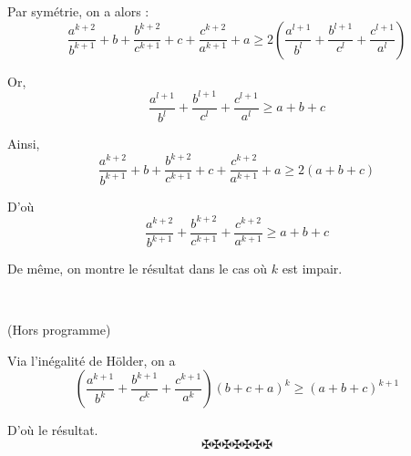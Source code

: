 Par sym{\'e}trie, on a alors :
\[ \frac{a^{k + 2}}{b^{k + 1}} + b + \frac{b^{k + 2}}{c^{k + 1}} + c +
   \frac{c^{k + 2}}{a^{k + 1}} + a \geqslant 2 \left( \frac{a^{l + 1}}{b^l} +
   \frac{b^{l + 1}}{c^l} + \frac{c^{l + 1}}{a^l} \right) \]


Or,
\[ \frac{a^{l + 1}}{b^l} + \frac{b^{l + 1}}{c^l} + \frac{c^{l + 1}}{a^l}
   \geqslant a + b + c \]


Ainsi,
\[ \  \]
\[ \frac{a^{k + 2}}{b^{k + 1}} + b + \frac{b^{k + 2}}{c^{k + 1}} + c +
   \frac{c^{k + 2}}{a^{k + 1}} + a \geqslant 2 (a + b + c) \]


D'o{\`u}
\[ \frac{a^{k + 2}}{b^{k + 1}} + \frac{b^{k + 2}}{c^{k + 1}} + \frac{c^{k +
   2}}{a^{k + 1}} \geqslant a + b + c \]


De m{\^e}me, on montre le r{\'e}sultat dans le cas o{\`u} $k$ est impair.

\

(Hors programme)

Via l'in{\'e}galit{\'e} de H{\"o}lder, on a
\[ \left( \frac{a^{k + 1}}{b^k} + \frac{b^{k + 1}}{c^k} + \frac{c^{k +
   1}}{a^k} \right) (b + c + a)^k \geqslant (a + b + c)^{k + 1} \]


D'o{\`u} le r{\'e}sultat.
\[ \maltese \maltese \maltese \maltese \maltese \maltese \maltese \]
